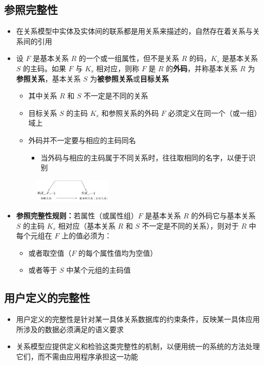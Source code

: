 \subsection{参照完整性}
\begin{itemize}
    \item 在关系模型中实体及实体间的联系都是用关系来描述的，自然存在着关系与关系间的引用
    \item 设 $F$ 是基本关系 $R$ 的一个或一组属性，但不是关系 $R$ 的码，$K_s$ 是基本关系 $S$ 的主码。如果 $F$ 与 $K_s$ 相对应，则称 $F$ 是 $R$ 的\textbf{外码}，并称基本关系 $R$ 为\textbf{参照关系}，基本关系 $S$ 为\textbf{被参照关系}或\textbf{目标关系}
    \begin{itemize}
        \item 其中关系 $R$ 和 $S$ 不一定是不同的关系
        \item 目标关系 $S$ 的主码 $K_s$ 和参照关系的外码 $F$ 必须定义在同一个（或一组）域上
        \item 外码并不一定要与相应的主码同名
        \begin{itemize}
            \item 当外码与相应的主码属于不同关系时，往往取相同的名字，以便于识别
        \end{itemize}
    \end{itemize}
    \begin{figure}[H]
        \vspace{-0.5em}
	    \centering
	    \includegraphics[width=0.35\textwidth]{images/2.2.2}
        \vspace{-1em}
	\end{figure}
    \item \textbf{参照完整性规则：}若属性（或属性组）$F$ 是基本关系 $R$ 的外码它与基本关系 $S$ 的主码 $K_s$ 相对应（基本关系 $R$ 和 $S$ 不一定是不同的关系），则对于 $R$ 中每个元组在 $F$ 上的值必须为：
    \begin{itemize}
        \item 或者取空值（$F$ 的每个属性值均为空值）
        \item 或者等于 $S$ 中某个元组的主码值
    \end{itemize}
\end{itemize}

\subsection{用户定义的完整性}
\begin{itemize}
    \item 用户定义的完整性是针对某一具体关系数据库的约束条件，反映某一具体应用所涉及的数据必须满足的语义要求
    \item 关系模型应提供定义和检验这类完整性的机制，以便用统一的系统的方法处理它们，而不需由应用程序承担这一功能
\end{itemize}

